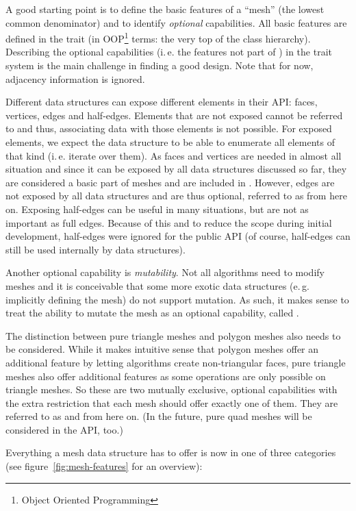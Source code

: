 A good starting point is to define the basic features of a \enquote{mesh} (the lowest common denominator) and to identify \emph{optional} capabilities.
All basic features are defined in the trait  (in OOP\footnote{Object Oriented Programming} terms: the very top of the class hierarchy).
Describing the optional capabilities (i.\,e. the features not part of ) in the trait system is the main challenge in finding a good design.
Note that for now, adjacency information is ignored.

Different data structures can expose different elements in their API: faces, vertices, edges and half-edges.
Elements that are not exposed cannot be referred to and thus, associating data with those elements is not possible.
For exposed elements, we expect the data structure to be able to enumerate all elements of that kind (i.\,e. iterate over them).
As faces and vertices are needed in almost all situation and since it can be exposed by all data structures discussed so far, they are considered a basic part of meshes and are included in .
However, edges are not exposed by all data structures and are thus optional, referred to as  from here on.
Exposing half-edges can be useful in many situations, but are not as important as full edges.
Because of this and to reduce the scope during initial development, half-edges were ignored for the public API (of course, half-edges can still be used internally by data structures).

Another optional capability is \emph{mutability}.
Not all algorithms need to modify meshes and it is conceivable that some more exotic data structures (e.\,g. implicitly defining the mesh) do not support mutation.
As such, it makes sense to treat the ability to mutate the mesh as an optional capability, called .

The distinction between pure triangle meshes and polygon meshes also needs to be considered.
While it makes intuitive sense that polygon meshes offer an additional feature by letting algorithms create non-triangular faces, pure triangle meshes also offer additional features as some operations are only possible on triangle meshes.
So these are two mutually exclusive, optional capabilities with the extra restriction that each mesh should offer exactly one of them.
They are referred to as  and  from here on.
(In the future, pure quad meshes will be considered in the API, too.)

Everything a mesh data structure has to offer is now in one of three categories (see figure~\ref{fig:mesh-features} for an overview):

